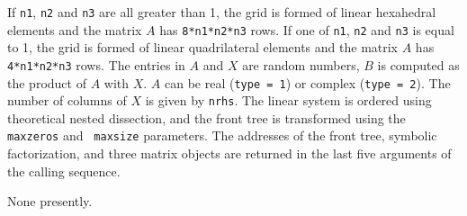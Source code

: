 \begin{enumerate}
If {\tt n1}, {\tt n2} and {\tt n3} are all greater than 1,
the grid is formed of linear hexahedral elements and
the matrix $A$ has {\tt 8*n1*n2*n3} rows.
If one of {\tt n1}, {\tt n2} and {\tt n3} is equal to 1,
the grid is formed of linear quadrilateral elements and
the matrix $A$ has {\tt 4*n1*n2*n3} rows.
The entries in $A$ and $X$ are random numbers,
$B$ is computed as the product of $A$ with $X$.
$A$ can be real ({\tt type = 1}) or complex ({\tt type = 2}).
The number of columns of $X$ is given by {\tt nrhs}.
The linear system is ordered using theoretical nested dissection,
and the front tree is transformed using the {\tt maxzeros} and {\tt
maxsize} parameters.
The addresses of the front tree, symbolic factorization, and three
matrix objects are returned in the last five arguments of the
calling sequence.
\par {}
None presently.
\end{enumerate}
